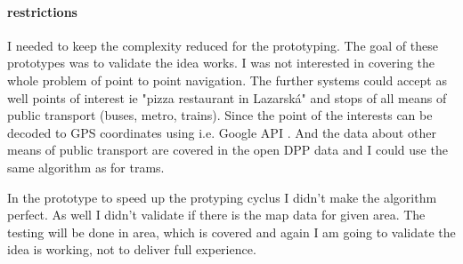 		
	
	\paragraph{\gps}
	
	
	\paragraph{restrictions}
	I needed to keep the complexity reduced for the prototyping. The goal of these prototypes was to validate the idea works. I was not interested in covering the whole problem of point to point navigation.
	The further systems could accept as well points of interest ie "pizza restaurant in Lazarská" and stops of all means of public transport (buses, metro, trains).
	Since the point of the interests can be decoded to GPS coordinates using i.e. Google API \cite{google-api}. And the data about other means of public transport are covered in the open DPP data \cite{dpp-data} and I could use the same algorithm as for trams.
	
	In the \gps prototype to speed up the protyping cyclus I didn't make the algorithm perfect. As well I didn't validate if there is the map data for given area. The testing will be done in area, which is covered and again I am going to validate the idea is working, not to deliver full experience.
	
	